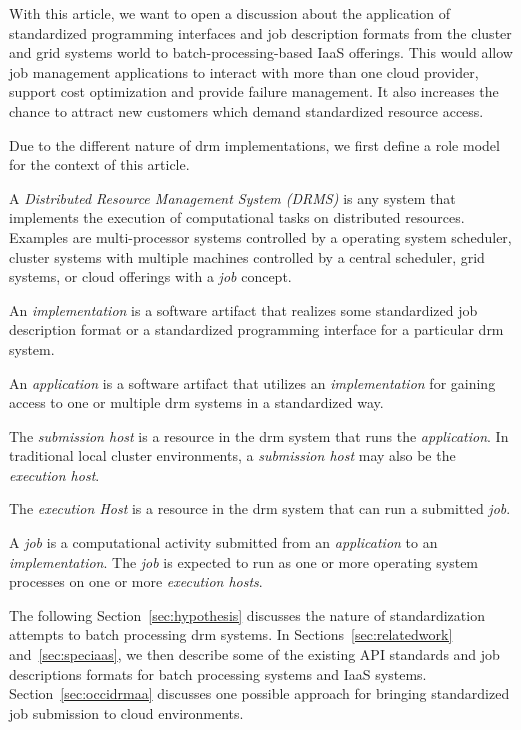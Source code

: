 \documentclass[twocolumn]{svjour3}       %
\begin{document}
With this article, we want to open a discussion about the application of standardized programming interfaces and job description formats from the cluster and grid systems world to batch-processing-based IaaS offerings. This would allow job management applications to interact with more than one cloud provider, support cost optimization and provide failure management. It also increases the chance to attract new customers which demand standardized resource access.

\label{sec:rolemodel}

Due to the different nature of \gls{drm} implementations, we first define a role model for the context of this article.

A \emph{Distributed Resource Management System (DRMS)} is any system that implements the execution of computational tasks on distributed resources. Examples are multi-processor systems controlled by a operating system scheduler, cluster systems with multiple machines controlled by a central scheduler, grid systems, or cloud offerings with a \emph{job} concept.

An \emph{implementation} is a software artifact that realizes some standardized job description format or a standardized programming interface for a particular \gls{drm} system.

An \emph{application} is a software artifact that utilizes an \emph{implementation} for gaining access to one or multiple \gls{drm} systems in a standardized way.

The \emph{submission host} is a resource in the \gls{drm} system that runs the \emph{application}. In traditional local cluster environments, a \emph{submission host} may also be the \emph{execution host}.

The \emph{execution Host} is a resource in the \gls{drm} system that can run a submitted \emph{job}.

A \emph{job} is a computational activity submitted from an \emph{application} to an \emph{implementation}. The \emph{job} is expected to run as one or more operating system processes on one or more \emph{execution hosts}.

The following Section~\ref{sec:hypothesis} discusses the nature of standardization attempts to batch processing \gls{drm} systems.  In Sections~\ref{sec:relatedwork} and~\ref{sec:speciaas}, we then describe some of the existing API standards and job descriptions formats for batch processing systems and IaaS systems.  Section~\ref{sec:occidrmaa} discusses one possible approach for bringing standardized job submission to cloud environments. 
\end{document}
